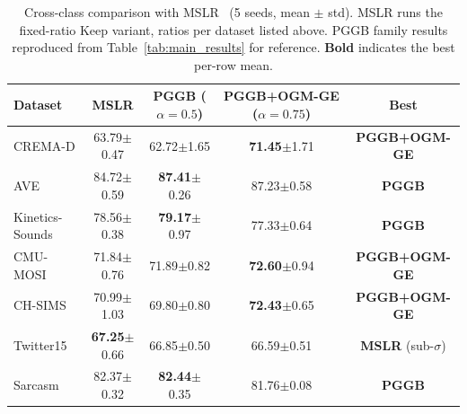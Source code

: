 \documentclass{article}
\begin{document}
\begin{table}[H]
\centering
\caption{Cross-class comparison with MSLR~\citep{yao2022mslr} (5 seeds, mean $\pm$ std). MSLR runs the fixed-ratio Keep variant, ratios per dataset listed above. PGGB family results reproduced from Table~\ref{tab:main_results} for reference. \textbf{Bold} indicates the best per-row mean.}
\label{tab:mslr_comparison}
\vspace{0.3em}
\footnotesize
\begin{tabular}{lcccc}
\toprule
\textbf{Dataset} & MSLR & PGGB ($\alpha{=}0.5$) & PGGB+OGM-GE ($\alpha{=}0.75$) & Best \\
\midrule
CREMA-D    & 63.79{\scriptsize$\pm$0.47} & 62.72{\scriptsize$\pm$1.65} & \textbf{71.45}{\scriptsize$\pm$1.71} & \textbf{PGGB+OGM-GE} \\
AVE        & 84.72{\scriptsize$\pm$0.59} & \textbf{87.41}{\scriptsize$\pm$0.26} & 87.23{\scriptsize$\pm$0.58} & \textbf{PGGB} \\
Kinetics-Sounds & 78.56{\scriptsize$\pm$0.38} & \textbf{79.17}{\scriptsize$\pm$0.97} & 77.33{\scriptsize$\pm$0.64} & \textbf{PGGB} \\
CMU-MOSI   & 71.84{\scriptsize$\pm$0.76} & 71.89{\scriptsize$\pm$0.82} & \textbf{72.60}{\scriptsize$\pm$0.94} & \textbf{PGGB+OGM-GE} \\
CH-SIMS  & 70.99{\scriptsize$\pm$1.03} & 69.80{\scriptsize$\pm$0.80} & \textbf{72.43}{\scriptsize$\pm$0.65} & \textbf{PGGB+OGM-GE} \\
Twitter15  & \textbf{67.25}{\scriptsize$\pm$0.66} & 66.85{\scriptsize$\pm$0.50} & 66.59{\scriptsize$\pm$0.51} & \textbf{MSLR} (sub-$\sigma$) \\
Sarcasm    & 82.37{\scriptsize$\pm$0.32} & \textbf{82.44}{\scriptsize$\pm$0.35} & 81.76{\scriptsize$\pm$0.08} & \textbf{PGGB} \\
\bottomrule
\end{tabular}
\end{table}


\newpage

\end{document}
